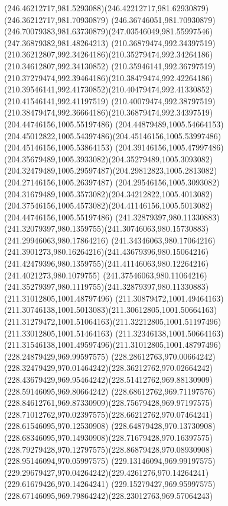 {{\curveto(246.46212717,981.5293088)(246.42212717,981.62930879)(246.36212717,981.70930879)
\lineto(246.36746051,981.70930879)
\curveto(246.70079383,981.63730879)(247.03546049,981.55997546)(247.36879382,981.48264213)
\moveto(210.36879474,992.34397519)
\curveto(210.36212807,992.34264186)(210.35279474,992.34264186)(210.34612807,992.34130852)
\curveto(210.35946141,992.36797519)(210.37279474,992.39464186)(210.38479474,992.42264186)
\curveto(210.39546141,992.41730852)(210.40479474,992.41330852)(210.41546141,992.41197519)
\curveto(210.40079474,992.38797519)(210.38479474,992.36664186)(210.36879474,992.34397519)
\moveto(204.44746156,1005.55197486)
\curveto(204.44879489,1005.54664153)(204.45012822,1005.54397486)(204.45146156,1005.53997486)
\lineto(204.45146156,1005.53864153)
\curveto(204.39146156,1005.47997486)(204.35679489,1005.3933082)(204.35279489,1005.3093082)
\curveto(204.32479489,1005.29597487)(204.29812823,1005.2813082)(204.27146156,1005.26397487)
\curveto(204.29546156,1005.3093082)(204.31679489,1005.3573082)(204.34212822,1005.4013082)
\curveto(204.37546156,1005.4573082)(204.41146156,1005.5013082)(204.44746156,1005.55197486)
\moveto(241.32879397,980.11330883)
\curveto(241.32079397,980.1359755)(241.30746063,980.15730883)(241.29946063,980.17864216)
\curveto(241.34346063,980.17064216)(241.3901273,980.16264216)(241.43679396,980.15064216)
\curveto(241.42479396,980.1359755)(241.41146063,980.12264216)(241.4021273,980.1079755)
\curveto(241.37546063,980.11064216)(241.35279397,980.1119755)(241.32879397,980.11330883)
\moveto(211.31012805,1001.48797496)
\curveto(211.30879472,1001.49464163)(211.30746138,1001.5013083)(211.30612805,1001.50664163)
\curveto(211.31279472,1001.51064163)(211.32212805,1001.51197496)(211.33012805,1001.51464163)
\curveto(211.32346138,1001.50664163)(211.31546138,1001.49597496)(211.31012805,1001.48797496)
\moveto(228.24879429,969.99597575)
\curveto(228.28612763,970.00664242)(228.32479429,970.01464242)(228.36212762,970.02664242)
\curveto(228.43679429,969.95464242)(228.51412762,969.88130909)(228.59146095,969.80664242)
\curveto(228.68612762,969.71197576)(228.84612761,969.87330909)(228.75679428,969.97197575)
\curveto(228.71012762,970.02397575)(228.66212762,970.07464241)(228.61546095,970.12530908)
\curveto(228.64879428,970.13730908)(228.68346095,970.14930908)(228.71679428,970.16397575)
\curveto(228.79279428,970.12797575)(228.86879428,970.08930908)(228.95146094,970.05997575)
\curveto(229.13146094,969.99197575)(229.29679427,970.04264242)(229.4261276,970.14264241)
\lineto(229.61679426,970.14264241)
\curveto(229.15279427,969.95997575)(228.67146095,969.79864242)(228.23012763,969.57064243)
}}
